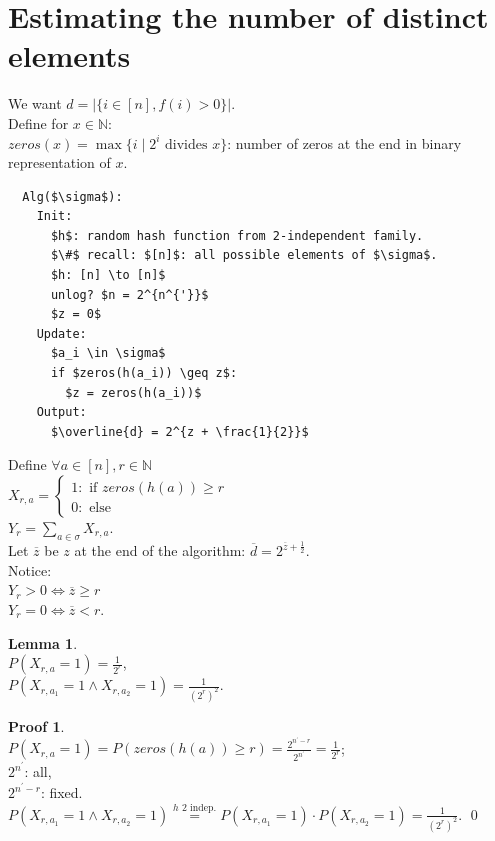 \documentclass[a4paper, 12pt]{book}
\theoremstyle{definition}
\newtheorem{lemma}[counter]{Lemma}
\newtheorem{pro}[counter]{Proof}
\theoremstyle{remark}
\newcommand{\N}{\mathbb{N}}
\begin{document}

\section{Estimating the number of distinct elements}

We want $d = |\{i \in [n], f(i) > 0\}|$. \\
Define for $x \in \N$: \\
$zeros(x) = \max \{i \mid 2^i \text{ divides } x\}$: number of zeros at the end in binary representation of $x$.
\begin{lstlisting}
  Alg($\sigma$):
    Init:
      $h$: random hash function from 2-independent family.
      $\#$ recall: $[n]$: all possible elements of $\sigma$.
      $h: [n] \to [n]$
      unlog? $n = 2^{n^{'}}$
      $z = 0$
    Update:
      $a_i \in \sigma$
      if $zeros(h(a_i)) \geq z$:
        $z = zeros(h(a_i))$
    Output:
      $\overline{d} = 2^{z + \frac{1}{2}}$
\end{lstlisting}
Define $\forall a \in [n], r \in \N$ \\
$X_{r, a} = \begin{cases}
  1: \text{ if } zeros(h(a)) \geq r \\
  0: \text{ else}
\end{cases}$ \\
$Y_r = \sum_{a \in \sigma} X_{r, a}$. \\
Let $\overline{z}$ be $z$ at the end of the algorithm: $\overline{d} = 2^{\overline{z} + \frac{1}{2}}$. \\
Notice: \\
$Y_r > 0 \iff \overline{z} \geq r$ \\
$Y_r = 0 \iff \overline{z} < r$.
\begin{lemma} \text{} \\
  $P(X_{r, a} = 1) = \frac{1}{2^r}$, \\
  $P(X_{r, a_1} = 1 \land X_{r, a_2} = 1) = \frac{1}{\left(2^r\right)^2}$.
\end{lemma}
\begin{pro} \text{} \\
  $P(X_{r, a} = 1) = P(zeros(h(a)) \geq r) = \frac{2^{n^{'}-r}}{2^{n^{'}}} = \frac{1}{2^r}$; \\
  $2^{n^{'}}$: all, \\
  $2^{n^{'}-r}$: fixed. \\
  $P(X_{r, a_1} = 1 \land X_{r, a_2} = 1) \stackrel{h \text{ 2 indep.}}{=}
  P(X_{r, a_1} = 1) \cdot P(X_{r, a_2} = 1) = \frac{1}{\left(2^r\right)^2}$.
  \qed
\end{pro}
\end{document}
